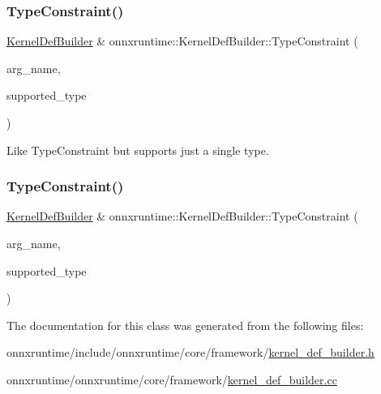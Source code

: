 \subsubsection{\texorpdfstring{Type\+Constraint()}{TypeConstraint()}\hspace{0.1cm}{\footnotesize\ttfamily [3/4]}}
{\footnotesize\ttfamily \mbox{\hyperlink{classonnxruntime_1_1KernelDefBuilder}{Kernel\+Def\+Builder}} \& onnxruntime\+::\+Kernel\+Def\+Builder\+::\+Type\+Constraint (\begin{DoxyParamCaption}\item[{const std\+::string \&}]{arg\+\_\+name,  }\item[{\mbox{\hyperlink{namespaceonnxruntime_ad77d0a6e838ec7da5dc35fed5ee66b49}{M\+L\+Data\+Type}}}]{supported\+\_\+type }\end{DoxyParamCaption})}

Like Type\+Constraint but supports just a single type. \mbox{\label{classonnxruntime_1_1KernelDefBuilder_a8744059bf033d05df187864acec7d75a}} 
\subsubsection{\texorpdfstring{Type\+Constraint()}{TypeConstraint()}\hspace{0.1cm}{\footnotesize\ttfamily [4/4]}}
{\footnotesize\ttfamily \mbox{\hyperlink{classonnxruntime_1_1KernelDefBuilder}{Kernel\+Def\+Builder}} \& onnxruntime\+::\+Kernel\+Def\+Builder\+::\+Type\+Constraint (\begin{DoxyParamCaption}\item[{const char $\ast$}]{arg\+\_\+name,  }\item[{\mbox{\hyperlink{namespaceonnxruntime_ad77d0a6e838ec7da5dc35fed5ee66b49}{M\+L\+Data\+Type}}}]{supported\+\_\+type }\end{DoxyParamCaption})}



The documentation for this class was generated from the following files\+:\begin{DoxyCompactItemize}
\item 
onnxruntime/include/onnxruntime/core/framework/\mbox{\hyperlink{kernel__def__builder_8h}{kernel\+\_\+def\+\_\+builder.\+h}}\item 
onnxruntime/onnxruntime/core/framework/\mbox{\hyperlink{kernel__def__builder_8cc}{kernel\+\_\+def\+\_\+builder.\+cc}}\end{DoxyCompactItemize}
